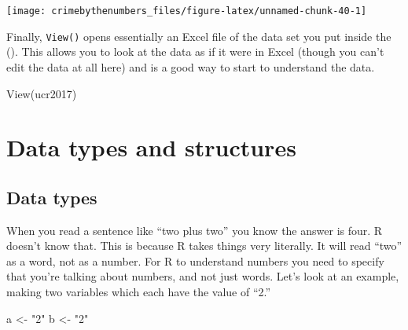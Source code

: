 \documentclass[
  a4paper,
]{krantz}
\makeatletter
\newenvironment{Shaded}{\begin{snugshade}}{\end{snugshade}}
\newcommand{\AttributeTok}[1]{\textcolor[rgb]{0.77,0.63,0.00}{#1}}
\newcommand{\FunctionTok}[1]{\textcolor[rgb]{0.00,0.00,0.00}{#1}}
\newcommand{\NormalTok}[1]{#1}
\newcommand{\OtherTok}[1]{\textcolor[rgb]{0.56,0.35,0.01}{#1}}
\newcommand{\SpecialCharTok}[1]{\textcolor[rgb]{0.00,0.00,0.00}{#1}}
\newcommand{\StringTok}[1]{\textcolor[rgb]{0.31,0.60,0.02}{#1}}
\newenvironment{kframe}{%
\medskip{}
\setlength{\fboxsep}{.8em}
 \def\at@end@of@kframe{}%
 \ifinner\ifhmode%
  \def\at@end@of@kframe{\end{minipage}}%
  \begin{minipage}{\columnwidth}%
 \fi\fi%
 \def\FrameCommand##1{\hskip\@totalleftmargin \hskip-\fboxsep
 \colorbox{shadecolor}{##1}\hskip-\fboxsep
     \hskip-\linewidth \hskip-\@totalleftmargin \hskip\columnwidth}%
 \MakeFramed {\advance\hsize-\width
   \@totalleftmargin\z@ \linewidth\hsize
   \@setminipage}}%
 {\par\unskip\endMakeFramed%
 \at@end@of@kframe}
\renewenvironment{Shaded}{\begin{kframe}}{\end{kframe}}
\makeatother
\begin{document}
\begin{Shaded}
\end{Shaded}

\begin{center}\texttt{[image: crimebythenumbers\_files/figure-latex/unnamed-chunk-40-1]} \end{center}

Finally, \texttt{View()} opens essentially an Excel file of
the data set you put inside the (). This allows you to look
at the data as if it were in Excel (though you can't edit
the data at all here) and is a good way to start to
understand the data.

\begin{Shaded}
\begin{Highlighting}[]
\FunctionTok{View}\NormalTok{(ucr2017)}
\end{Highlighting}
\end{Shaded}

\hypertarget{data-types}{%
\chapter{Data types and structures}\label{data-types}}

\hypertarget{section-data-types}{%
\section{Data types}\label{section-data-types}}

When you read a sentence like ``two plus two'' you know the
answer is four. R doesn't know that. This is because R takes
things very literally. It will read ``two'' as a word, not
as a number. For R to understand numbers you need to specify
that you're talking about numbers, and not just words. Let's
look at an example, making two variables which each have the
value of ``2.''

\begin{Shaded}
\begin{Highlighting}[]
\NormalTok{a }\OtherTok{\textless{}{-}} \StringTok{"2"}
\NormalTok{b }\OtherTok{\textless{}{-}} \StringTok{"2"}
\end{Highlighting}
\end{Shaded}
\end{document}
